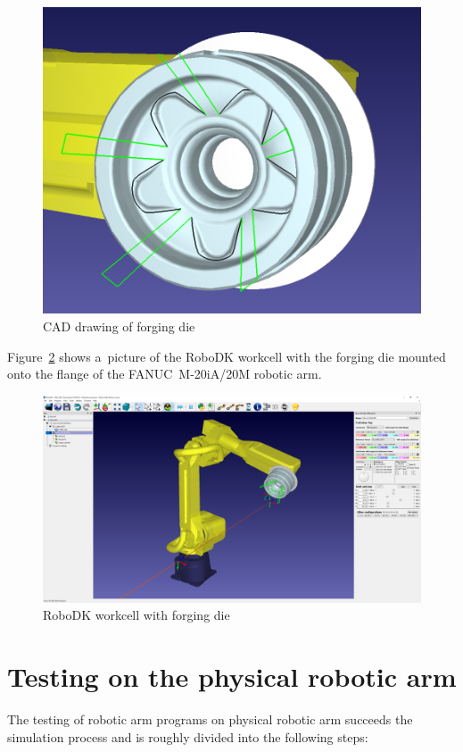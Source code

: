 \begin{figure}[h]
    \centering
    \includegraphics[width=0.5\linewidth]{img/cad.PNG}
    \caption{CAD drawing of forging die}
    \label{fig:cad}
\end{figure}
\noindent Figure~\ref{fig:robodk_die} shows a~picture of the RoboDK workcell with the forging die mounted onto the flange of the FANUC~M-20iA/20M robotic arm.

\begin{figure}[h!]
    \centering
    \includegraphics[width=0.8\linewidth]{img/robodk_cast.PNG}
    \caption{RoboDK workcell with forging die}
    \label{fig:robodk_die}
\end{figure}


\section{Testing on the physical robotic arm}

The testing of robotic arm programs on physical robotic arm succeeds the simulation process and is roughly divided into the following steps:

